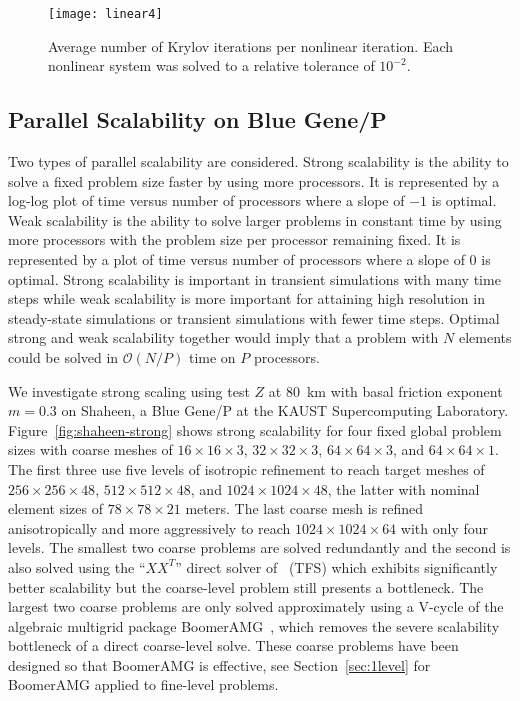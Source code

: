 \documentclass[final]{siamltex}
\newcommand{\citep}[1]{{\cite{#1}}}
\newcommand{\bigO}{{\mathcal{O}}}
\begin{document}
\begin{figure}
  \centering\texttt{[image: linear4]}
  \caption{Average number of Krylov iterations per nonlinear iteration.  Each nonlinear system was solved to a relative tolerance of $10^{-2}$.}\label{fig:linear}
\end{figure}

\subsection{Parallel Scalability on Blue Gene/P}\label{sec:pscaling}
Two types of parallel scalability are considered.
Strong scalability is the ability to solve a fixed problem size faster by using more processors.
It is represented by a log-log plot of time versus number of processors where a slope of $-1$ is optimal.
Weak scalability is the ability to solve larger problems in constant time by using more processors with the problem size per processor remaining fixed.
It is represented by a plot of time versus number of processors where a slope of $0$ is optimal.
Strong scalability is important in transient simulations with many time steps while weak scalability is more important for attaining high resolution in steady-state simulations or transient simulations with fewer time steps.
Optimal strong and weak scalability together would imply that a problem with $N$ elements could be solved in $\bigO(N/P)$ time on $P$ processors.

We investigate strong scaling using test $Z$ at \SI{80}{\kilo\metre} with basal friction exponent $m= 0.3$ on Shaheen, a Blue Gene/P at the KAUST Supercomputing Laboratory.
Figure~\ref{fig:shaheen-strong} shows strong scalability for four fixed global problem sizes with coarse meshes of $16\times 16\times 3$, $32\times 32\times 3$, $64\times 64\times 3$, and $64\times 64\times 1$.
The first three use five levels of isotropic refinement to reach target meshes of $256\times 256\times 48$, $512\times 512\times 48$, and $1024\times 1024\times 48$, the latter with nominal element sizes of $78\times 78\times 21$ meters.
The last coarse mesh is refined anisotropically and more aggressively to reach $1024\times 1024\times 64$ with only four levels.
The smallest two coarse problems are solved redundantly and the second is also solved using the ``$XX^T$'' direct solver of~\cite{tufo2001fast} (TFS) which exhibits significantly better scalability but the coarse-level problem still presents a bottleneck.
The largest two coarse problems are only solved approximately using a V-cycle of the algebraic multigrid package BoomerAMG~\citep{henson2002bpa}, which removes the severe scalability bottleneck of a direct coarse-level solve.
These coarse problems have been designed so that BoomerAMG is effective, see Section~\ref{sec:1level} for BoomerAMG applied to fine-level problems.
\end{document}
